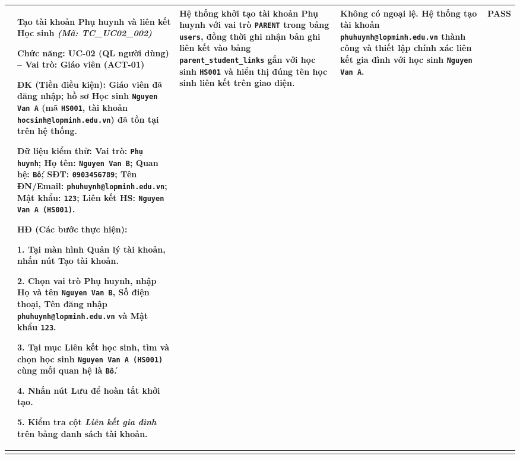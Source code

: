\documentclass[12pt,a4paper]{report}
\newcommand{\passbadge}{\textbf{\textcolor{passgreen}{PASS}}}
\newcommand{\tcheader}[2]{%
  \textbf{#1} \textit{(Mã: #2)}\par
}
\newcommand{\tcmeta}[2]{%
  \textbf{Chức năng:} #1 -- \textbf{Vai trò:} #2\par
}
\newcommand{\tcpre}[1]{%
  \textbf{ĐK (Tiền điều kiện):} #1\par
}
\newcommand{\tcdata}[1]{%
  \textbf{Dữ liệu kiểm thử:} #1\par
}
\begin{document}
{\begin{longtable}{|C{0.8cm}|L{6.8cm}|L{3.0cm}|L{2.9cm}|C{1.2cm}|}
{%
2 &
\tcheader{Tạo tài khoản Phụ huynh và liên kết Học sinh}{TC\_UC02\_002}
\tcmeta{UC-02 (QL người dùng)}{Giáo viên (ACT-01)}
\tcpre{Giáo viên đã đăng nhập; hồ sơ Học sinh \texttt{Nguyen Van A} (mã \texttt{HS001}, tài khoản \texttt{hocsinh@\allowbreak lopminh.edu.vn}) đã tồn tại trên hệ thống.}
\tcdata{Vai trò: \texttt{Phụ huynh}; Họ tên: \texttt{Nguyen Van B}; Quan hệ: \texttt{Bố}; SĐT: \texttt{0903456789}; Tên ĐN/Email: \texttt{phuhuynh@\allowbreak lopminh.edu.vn}; Mật khẩu: \texttt{123}; Liên kết HS: \texttt{Nguyen Van A (HS001)}.}
\textbf{HĐ (Các bước thực hiện):}\par
1. Tại màn hình \textbf{Quản lý tài khoản}, nhấn nút \textbf{Tạo tài khoản}.\par
2. Chọn vai trò \textbf{Phụ huynh}, nhập Họ và tên \texttt{Nguyen Van B}, Số điện thoại, Tên đăng nhập \texttt{phuhuynh@\allowbreak lopminh.edu.vn} và Mật khẩu \texttt{123}.\par
3. Tại mục \textbf{Liên kết học sinh}, tìm và chọn học sinh \texttt{Nguyen Van A (HS001)} cùng mối quan hệ là \texttt{Bố}.\par
4. Nhấn nút \textbf{Lưu} để hoàn tất khởi tạo.\par
5. Kiểm tra cột \textit{Liên kết gia đình} trên bảng danh sách tài khoản.
&
Hệ thống khởi tạo tài khoản Phụ huynh với vai trò \texttt{PARENT} trong bảng \texttt{users}, đồng thời ghi nhận bản ghi liên kết vào bảng \texttt{parent\_\allowbreak student\_\allowbreak links} gắn với học sinh \texttt{HS001} và hiển thị đúng tên học sinh liên kết trên giao diện.
&
Không có ngoại lệ. Hệ thống tạo tài khoản \texttt{phuhuynh@\allowbreak lopminh.edu.vn} thành công và thiết lập chính xác liên kết gia đình với học sinh \texttt{Nguyen Van A}.
&
\passbadge \\
\hline

}
\end{longtable}}
\end{document}

